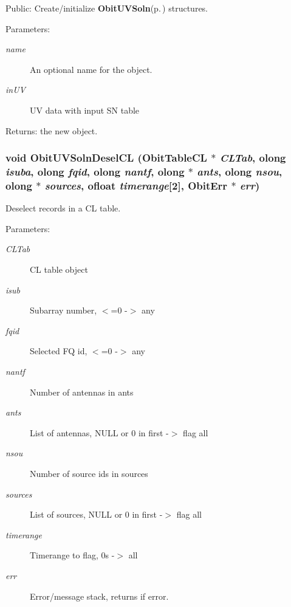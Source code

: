 Public: Create/initialize {\bf Obit\-UVSoln}{\rm (p.\,\pageref{structObitUVSoln})} structures. 

\begin{Desc}
\item[Parameters:]
\begin{description}
\item[{\em name}]An optional name for the object. \item[{\em in\-UV}]UV data with input SN table \end{description}
\end{Desc}
\begin{Desc}
\item[Returns:]the new object. \end{Desc}
\subsubsection{\setlength{\rightskip}{0pt plus 5cm}void Obit\-UVSoln\-Desel\-CL ({\bf Obit\-Table\-CL} $\ast$ {\em CLTab}, {\bf olong} {\em isuba}, {\bf olong} {\em fqid}, {\bf olong} {\em nantf}, {\bf olong} $\ast$ {\em ants}, {\bf olong} {\em nsou}, {\bf olong} $\ast$ {\em sources}, {\bf ofloat} {\em timerange}[2], {\bf Obit\-Err} $\ast$ {\em err})}\label{ObitUVSoln_8h_a30}


Deselect records in a CL table. 

\begin{Desc}
\item[Parameters:]
\begin{description}
\item[{\em CLTab}]CL table object \item[{\em isub}]Subarray number, $<$=0 -$>$ any \item[{\em fqid}]Selected FQ id, $<$=0 -$>$ any \item[{\em nantf}]Number of antennas in ants \item[{\em ants}]List of antennas, NULL or 0 in first -$>$ flag all \item[{\em nsou}]Number of source ids in sources \item[{\em sources}]List of sources, NULL or 0 in first -$>$ flag all \item[{\em timerange}]Timerange to flag, 0s -$>$ all \item[{\em err}]Error/message stack, returns if error. \end{description}
\end{Desc}
